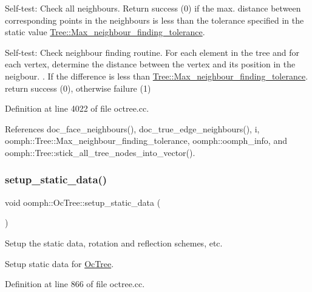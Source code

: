 Self-\/test\+: Check all neighbours. Return success (0) if the max. distance between corresponding points in the neighbours is less than the tolerance specified in the static value \hyperlink{classoomph_1_1Tree_aef9abebc166fa3bf81ecb59ec0d5d6b2}{Tree\+::\+Max\+\_\+neighbour\+\_\+finding\+\_\+tolerance}. 

Self-\/test\+: Check neighbour finding routine. For each element in the tree and for each vertex, determine the distance between the vertex and its position in the neigbour. . If the difference is less than \hyperlink{classoomph_1_1Tree_aef9abebc166fa3bf81ecb59ec0d5d6b2}{Tree\+::\+Max\+\_\+neighbour\+\_\+finding\+\_\+tolerance}. return success (0), otherwise failure (1) 

Definition at line 4022 of file octree.\+cc.



References doc\+\_\+face\+\_\+neighbours(), doc\+\_\+true\+\_\+edge\+\_\+neighbours(), i, oomph\+::\+Tree\+::\+Max\+\_\+neighbour\+\_\+finding\+\_\+tolerance, oomph\+::oomph\+\_\+info, and oomph\+::\+Tree\+::stick\+\_\+all\+\_\+tree\+\_\+nodes\+\_\+into\+\_\+vector().

\mbox{\label{classoomph_1_1OcTree_a5d7b0830cd9c913786e23259c69c71a0}} 
\subsubsection{\texorpdfstring{setup\+\_\+static\+\_\+data()}{setup\_static\_data()}}
{\footnotesize\ttfamily void oomph\+::\+Oc\+Tree\+::setup\+\_\+static\+\_\+data (\begin{DoxyParamCaption}{ }\end{DoxyParamCaption})\hspace{0.3cm}{\ttfamily [static]}}



Setup the static data, rotation and reflection schemes, etc. 

Setup static data for \hyperlink{classoomph_1_1OcTree}{Oc\+Tree}. 

Definition at line 866 of file octree.\+cc.



